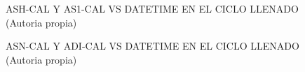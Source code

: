 \begin{figure}[H]
  \hfill
  \hfill
  \hfill
  \caption{ASH-CAL Y AS1-CAL VS DATETIME EN EL CICLO LLENADO (Autoria propia)}
  \end{figure}
\begin{figure}[H]
  \hfill
  \hfill
  \hfill
  \caption{ASN-CAL Y ADI-CAL VS DATETIME EN EL CICLO LLENADO (Autoria propia)}
  \end{figure}
